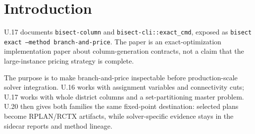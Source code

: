 \section{Introduction}

U.17 documents \texttt{bisect-column} and \texttt{bisect-cli::exact\_cmd},
exposed as \texttt{bisect exact --method branch-and-price}. The paper is an
exact-optimization implementation paper about column-generation contracts, not
a claim that the large-instance pricing strategy is complete.

The purpose is to make branch-and-price inspectable before production-scale
solver integration. U.16 works with assignment variables and connectivity cuts;
U.17 works with whole district columns and a set-partitioning master problem.
U.20 then gives both families the same fixed-point destination: selected plans
become RPLAN/RCTX artifacts, while solver-specific evidence stays in the
sidecar reports and method lineage.

